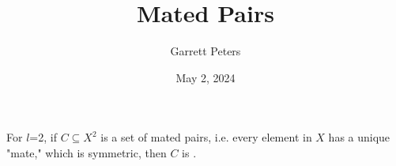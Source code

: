 \documentclass[a4paper]{article}
\title{Mated Pairs}
\date{May 2, 2024}
\author{Garrett Peters}
\begin{document}
\maketitle
\par{For \(l\)=2, if \(C \subseteq  X^2\) is a set of mated pairs, i.e. every element in \(X\) has a unique "mate," which is symmetric, then \(C\) is .}
\printbibliography
\end{document}
